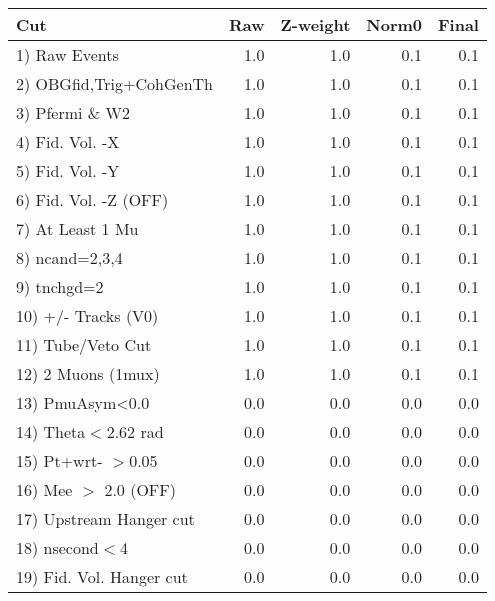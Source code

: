  \begin{table}[h!]\centering
 \begin{tabular}{||l||r|r|r|r||}
 \hline
 \hline
 Cut & Raw & Z-weight & Norm0 & Final \\
 \hline
  1) Raw Events           &         1.0 &         1.0 &         0.1 &         0.1 \\
  2) OBGfid,Trig+CohGenTh &         1.0 &         1.0 &         0.1 &         0.1 \\
  3) Pfermi \& W2         &         1.0 &         1.0 &         0.1 &         0.1 \\
  4) Fid. Vol. -X         &         1.0 &         1.0 &         0.1 &         0.1 \\
  5) Fid. Vol. -Y         &         1.0 &         1.0 &         0.1 &         0.1 \\
  6) Fid. Vol. -Z (OFF)   &         1.0 &         1.0 &         0.1 &         0.1 \\
  7) At Least 1 Mu        &         1.0 &         1.0 &         0.1 &         0.1 \\
  8) ncand=2,3,4          &         1.0 &         1.0 &         0.1 &         0.1 \\
  9) tnchgd=2             &         1.0 &         1.0 &         0.1 &         0.1 \\
 10) +/- Tracks (V0)      &         1.0 &         1.0 &         0.1 &         0.1 \\
 11) Tube/Veto Cut        &         1.0 &         1.0 &         0.1 &         0.1 \\
 12) 2 Muons (1mux)       &         1.0 &         1.0 &         0.1 &         0.1 \\
 13) PmuAsym<0.0          &         0.0 &         0.0 &         0.0 &         0.0 \\
 14) Theta$<$2.62 rad     &         0.0 &         0.0 &         0.0 &         0.0 \\
 15) Pt+wrt- $>$0.05      &         0.0 &         0.0 &         0.0 &         0.0 \\
 16) Mee $>$ 2.0  (OFF)   &         0.0 &         0.0 &         0.0 &         0.0 \\
 17) Upstream Hanger cut  &         0.0 &         0.0 &         0.0 &         0.0 \\
 18) nsecond$<$4          &         0.0 &         0.0 &         0.0 &         0.0 \\
 19) Fid. Vol. Hanger cut &         0.0 &         0.0 &         0.0 &         0.0 \\

\end{tabular}
\end{table}
